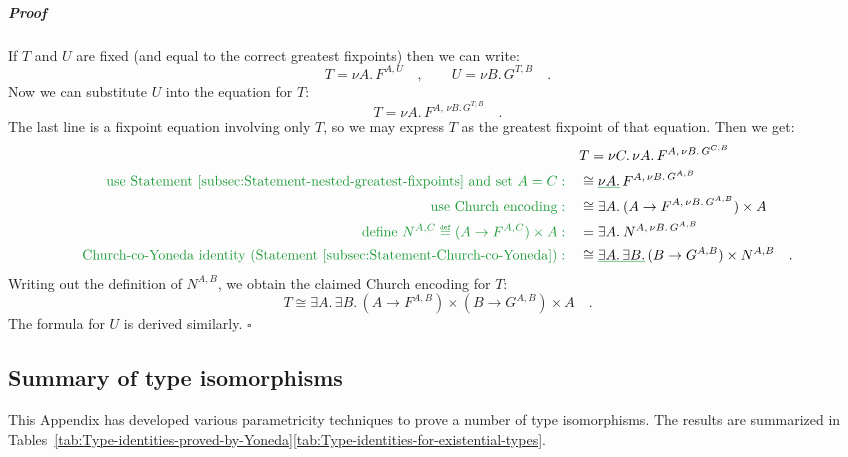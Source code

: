 \subparagraph{Proof}

If $T$ and $U$ are fixed (and equal to the correct greatest fixpoints)
then we can write:
\[
T=\nu A.\,F^{A,U}\quad,\quad\quad U=\nu B.\,G^{T,B}\quad.
\]
Now we can substitute $U$ into the equation for $T$:
\[
T=\nu A.\,F^{A,\,\nu B.\,G^{T,B}}\quad.
\]
The last line is a fixpoint equation involving only $T$, so we may
express $T$ as the greatest fixpoint of that equation. Then we get:
\begin{align*}
 & T=\nu C.\,\nu A.\,F^{A,\,\nu B.\,G^{C,B}}\\
{\color{greenunder}\text{use Statement~\ref{subsec:Statement-nested-greatest-fixpoints} and set }A=C:}\quad & \cong\gunderline{\nu A.}\,F^{A,\,\nu B.\,G^{A,B}}\\
{\color{greenunder}\text{use Church encoding}:}\quad & \cong\exists A.\:(A\rightarrow F^{A,\,\nu B.\,G^{A,B}})\times A\\
{\color{greenunder}\text{define }N^{A,C}\triangleq(A\rightarrow F^{A,C})\times A:}\quad & =\exists A.\:N^{A,\,\nu B.\,G^{A,B}}\\
{\color{greenunder}\text{Church-co-Yoneda identity (Statement~\ref{subsec:Statement-Church-co-Yoneda})}:}\quad & \cong\gunderline{\exists A.\,\exists B.}\,(B\rightarrow G^{A,B})\times N^{A,B}\quad.
\end{align*}
Writing out the definition of $N^{A,B}$, we obtain the claimed Church
encoding for $T$:
\[
T\cong\exists A.\,\exists B.\,(A\rightarrow F^{A,B})\times(B\rightarrow G^{A,B})\times A\quad.
\]
 The formula for $U$ is derived similarly. $\square$

\subsection{Summary of type isomorphisms}

This Appendix has developed various parametricity techniques to prove
a number of type isomorphisms. The results are summarized in Tables~\ref{tab:Type-identities-proved-by-Yoneda}\textendash \ref{tab:Type-identities-for-existential-types}.

